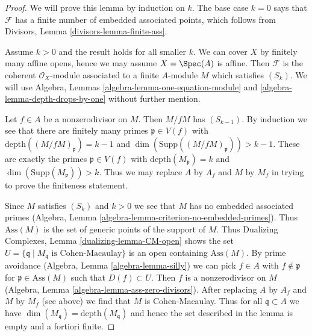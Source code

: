 \begin{proof}
We will prove this lemma by induction on $k$. The base case $k = 0$
says that $\mathcal{F}$ has a finite number of embedded associated points,
which follows from Divisors, Lemma \ref{divisors-lemma-finite-ass}.

\medskip\noindent
Assume $k > 0$ and the result holds for all smaller $k$.
We can cover $X$ by finitely many affine opens, hence we may
assume $X = \Spec(A)$ is affine. Then $\mathcal{F}$ is the
coherent $\mathcal{O}_X$-module associated to a finite $A$-module $M$
which satisfies $(S_k)$. We will use
Algebra, Lemmas \ref{algebra-lemma-one-equation-module} and
\ref{algebra-lemma-depth-drops-by-one}
without further mention.

\medskip\noindent
Let $f \in A$ be a nonzerodivisor on $M$. Then $M/fM$ has $(S_{k - 1})$.
By induction we see that there are finitely many
primes $\mathfrak p \in V(f)$ with
$\text{depth}((M/fM)_\mathfrak p) = k - 1$ and
$\dim(\text{Supp}((M/fM)_\mathfrak p)) > k - 1$.
These are exactly the primes $\mathfrak p \in V(f)$ with
$\text{depth}(M_\mathfrak p) = k$ and
$\dim(\text{Supp}(M_\mathfrak p)) > k$.
Thus we may replace $A$ by $A_f$ and $M$ by $M_f$
in trying to prove the finiteness statement.

\medskip\noindent
Since $M$ satisfies $(S_k)$ and $k > 0$ we see that $M$ has no
embedded associated primes
(Algebra, Lemma \ref{algebra-lemma-criterion-no-embedded-primes}).
Thus $\text{Ass}(M)$ is the set of generic points of the support
of $M$. Thus Dualizing Complexes, Lemma \ref{dualizing-lemma-CM-open}
shows the set
$U = \{\mathfrak q \mid M_\mathfrak q\text{ is Cohen-Macaulay}\}$
is an open containing $\text{Ass}(M)$.
By prime avoidance (Algebra, Lemma \ref{algebra-lemma-silly})
we can pick $f \in A$ with
$f \not \in \mathfrak p$ for $\mathfrak p \in \text{Ass}(M)$
such that $D(f) \subset U$.
Then $f$ is a nonzerodivisor on $M$
(Algebra, Lemma \ref{algebra-lemma-ass-zero-divisors}).
After replacing $A$ by $A_f$ and $M$ by $M_f$ (see above) we
find that $M$ is Cohen-Macaulay.
Thus for all $\mathfrak q \subset A$ we have
$\dim(M_\mathfrak q) = \text{depth}(M_\mathfrak q)$
and hence the set described in the lemma is empty
and a fortiori finite.
\end{proof}

